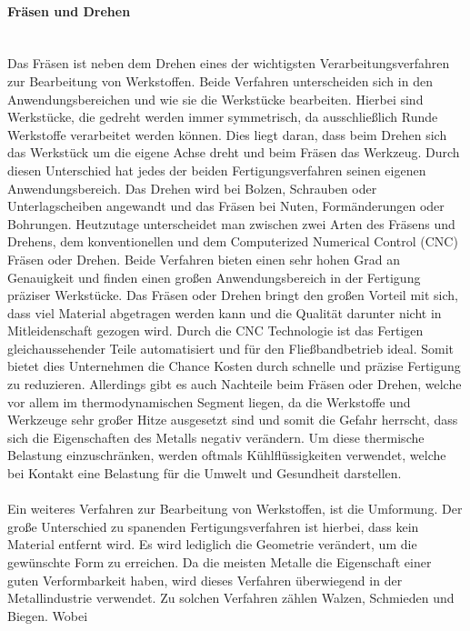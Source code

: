 \paragraph{Fräsen und Drehen}\mbox{}\\
Das Fräsen ist neben dem Drehen eines der wichtigsten Verarbeitungsverfahren zur Bearbeitung von Werkstoffen. Beide Verfahren unterscheiden sich in den 
Anwendungsbereichen und wie sie die Werkstücke bearbeiten. Hierbei sind Werkstücke, die gedreht werden immer symmetrisch, da ausschließlich Runde 
Werkstoffe verarbeitet werden können. Dies liegt daran, dass beim Drehen sich das Werkstück um die eigene Achse dreht und beim Fräsen das Werkzeug. 
Durch diesen Unterschied hat jedes der beiden Fertigungsverfahren seinen eigenen Anwendungsbereich. Das Drehen wird \zB bei Bolzen, Schrauben oder 
Unterlagscheiben angewandt und das Fräsen bei \zB Nuten, Formänderungen oder Bohrungen. Heutzutage unterscheidet man zwischen zwei Arten des Fräsens 
und Drehens, dem konventionellen und dem Computerized Numerical Control (CNC) Fräsen oder Drehen. Beide Verfahren bieten einen sehr hohen Grad an Genauigkeit 
und finden einen großen Anwendungsbereich in der Fertigung präziser Werkstücke. Das Fräsen oder Drehen bringt den großen Vorteil mit sich, dass viel Material 
abgetragen werden kann und die Qualität darunter nicht in Mitleidenschaft gezogen wird. Durch die CNC Technologie ist das Fertigen gleichaussehender Teile 
automatisiert und für den Fließbandbetrieb ideal. Somit bietet dies Unternehmen die Chance Kosten durch schnelle und präzise Fertigung zu reduzieren. 
Allerdings gibt es auch Nachteile beim Fräsen oder Drehen, welche vor allem im thermodynamischen Segment liegen, da die Werkstoffe und Werkzeuge sehr 
großer Hitze ausgesetzt sind und somit die Gefahr herrscht, dass sich die Eigenschaften \zB des Metalls negativ verändern. Um diese thermische Belastung 
einzuschränken, werden oftmals Kühlflüssigkeiten verwendet, welche bei Kontakt eine Belastung für die Umwelt und Gesundheit darstellen. %
\\\\
Ein weiteres Verfahren zur Bearbeitung von Werkstoffen, ist die Umformung. Der große Unterschied zu spanenden Fertigungsverfahren ist hierbei, dass kein 
Material entfernt wird. Es wird lediglich die Geometrie verändert, um die gewünschte Form zu erreichen. Da die meisten Metalle die Eigenschaft einer guten 
Verformbarkeit haben, wird dieses Verfahren überwiegend in der Metallindustrie verwendet. Zu solchen Verfahren zählen \zB Walzen, Schmieden und Biegen. Wobei 
